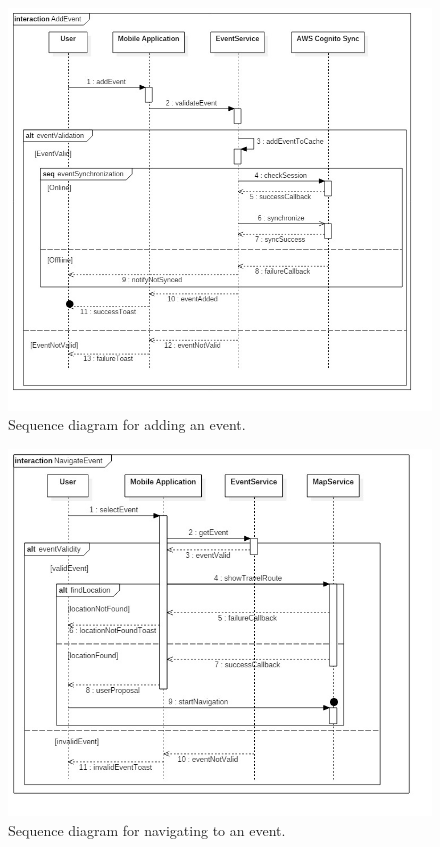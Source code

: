 \begin{figure}
	\centering
	\includegraphics[width=6in]{./diagrams/AddEvent.jpg}
	\caption{Sequence diagram for adding an event.}
	\label{fig:seqAddEvent}
\end{figure}

\begin{figure}
	\centering
	\includegraphics[width=6in]{./diagrams/NavigateEvent.jpg}
	\caption{Sequence diagram for navigating to an event.}
	\label{fig:seqNavigateEvent}
\end{figure}

